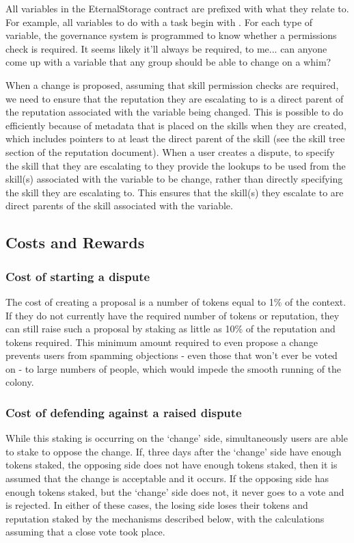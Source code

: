 All variables in the EternalStorage contract are prefixed with what they relate to. For example, all variables to do with a task begin with . For each type of variable, the governance system is programmed to know whether a permissions check is required. It seems likely it'll always be required, to me... can anyone come up with a variable that any group should be able to change on a whim?

When a change is proposed, assuming that skill permission checks are required, we need to ensure that the reputation they are escalating to is a direct parent of the reputation associated with the variable being changed. This is possible to do efficiently because of metadata that is placed on the skills when they are created, which includes pointers to at least the direct parent of the skill (see the skill tree section of the reputation document). When a user creates a dispute, to specify the skill that they are escalating to they provide the lookups to be used from the skill(s) associated with the variable to be change, rather than directly specifying the skill they are escalating to. This ensures that the skill(s) they escalate to are direct parents of the skill associated with the variable.

\subsection{Costs and Rewards}
\subsubsection{Cost of starting a dispute}
The cost of creating a proposal is a number of tokens equal to 1\% of the context. If they do not currently have the required number of tokens or reputation, they can still raise such a proposal by staking as little as 10\% of the reputation and tokens required. This minimum amount required to even propose a change prevents users from spamming objections - even those that won’t ever be voted on - to large numbers of people, which would impede the smooth running of the colony.

\subsubsection{Cost of defending against a raised dispute}
While this staking is occurring on the `change' side, simultaneously users are able to stake to oppose the change. If, three days after the `change' side have enough tokens staked, the opposing side does not have enough tokens staked, then it is assumed that the change is acceptable and it occurs. If the opposing side has enough tokens staked, but the `change' side does not, it never goes to a vote and is rejected. In either of these cases, the losing side loses their tokens and reputation staked by the mechanisms described below, with the calculations assuming that a close vote took place.

